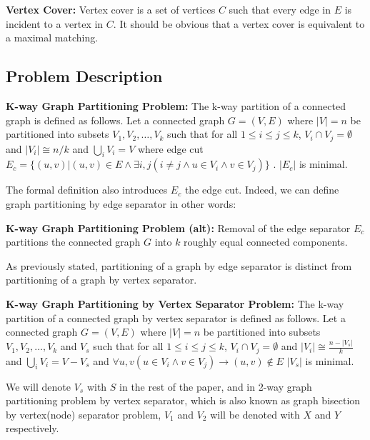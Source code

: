 \documentclass[a4paper,12pt]{article}
\begin{document}
\begin{dfn}
\textbf{Vertex Cover:} Vertex cover is a set of vertices $C$ such that
every edge in $E$ is incident to a vertex in $C$. It should be obvious
that a vertex cover is equivalent to a maximal matching.
\end{dfn}

\subsection{Problem Description}

\begin{dfn}
\textbf{K-way Graph Partitioning Problem:} The k-way partition of a
connected graph is defined as follows. Let a connected graph $G=(V,E)$
where $|V|=n$
be partitioned into subsets $V_1,V_2,\dots,V_k$ such that for all
$1\le i \le j \le k$, 
$ V_i \cap V_j = \emptyset $
and
$|V_i| \cong n/k $ and $ \bigcup_i{V_i=V} $
where edge cut $E_c = \{(u,v) | (u,v) \in E \wedge
\exists i,j (i \ne j \wedge u \in V_i \wedge v \in V_j) \}$ .
$|E_c|$ is minimal.
\end{dfn}

The formal definition also introduces $E_c$ the edge cut. Indeed, we
can define graph partitioning by edge separator in other words:
\begin{dfn}
\textbf{K-way Graph Partitioning Problem (alt):}
Removal of the edge separator $E_c$ partitions the connected graph $G$
into $k$ roughly equal connected components.
\end{dfn}

As previously stated, partitioning of a graph by edge separator is
distinct from partitioning of a graph by vertex separator.
\begin{dfn}
\textbf{K-way Graph Partitioning by Vertex Separator Problem:} The k-way partition of a
connected graph by vertex separator is defined as follows. Let a
connected graph $G=(V,E)$
where $|V|=n$
be partitioned into subsets $V_1,V_2,\dots,V_k$ and $V_s$ such that for all
$1\le i \le j \le k$, 
$ V_i \cap V_j = \emptyset $
and
$|V_i| \cong \frac{n-|V_s|}{k} $ and $ \bigcup_i{V_i=V-V_s} $
and $\forall u,v (u \in V_i \wedge v \in V_j) \rightarrow (u,v) \notin E$   
$|V_s|$ is minimal.
\end{dfn}

We will denote $V_s$ with $S$ in the rest of the paper, and in 2-way
graph partitioning problem by vertex separator, which is also known as
graph bisection by vertex(node) separator problem, $V_1$ and $V_2$
will be denoted with $X$ and $Y$ respectively.
\end{document}
